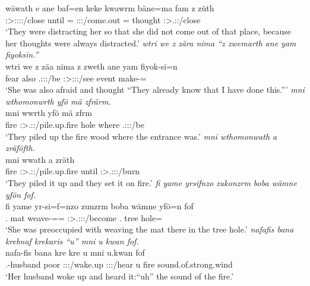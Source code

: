 \begin{exe}
	\gll wäwath e ane baf=en keke kwawrm bäne=ma fam z züth\\
	\Stpl:\Sbj>\Tsg:\Obj:\Io:\Nonpast:\Ipfv/close until {\Dem} \Recog={\Loc} {\Neg} \Sg:\Sbj:\Pst:\Dur/come.out \Recog={\Loc} thought {\Iam} \Stpl:\Sbj>\Tsg.\F:\Io:\Iter/close\\
	\trans `They were distracting her so that she did not come out of that place, because her thoughts were always distracted.'
	\emph{wtri we z zära nima ``z zwemarth ane yam fiyoksin.''}\\
	\gll wtri we z zäa nima z zweth ane yam fiyok-si=n\\
	fear also {\Iam} \Tsg.\F:\Sbj:\Pst:\Ipfv/be {\Quot} {\Iam} \Stpl:\Sbj>\Fsg:\Obj:\Rpst:\Pfv/see {\Dem} event make-\Nmlz=\Loc\\
	\trans `She was also afraid and thought ``They already know that I have done this.'''
	\emph{mni wthomonwrth yfö mä zfrärm.}\\
	\gll mni wwrth yfö mä zfrm\\
	fire \Stpl:\Sbj>\Tsg.\F:\Nonpast:\Ipfv/pile.up.fire hole where \Tsg.\F:\Sbj:\Pst:\Dur/be\\
	\trans `They piled up the fire wood where the entrance was.'
	\emph{mni wthomonwath a zräföfth.}\\
	\gll mni wwath a zräth\\
	fire \Stpl:\Sbj>\Tsg.\F:\Pst:\Ipfv/pile.up.fire until \Stpl:\Sbj>\Tsg.\F:\Obj:\Irr:\Pfv/burn\\
	\trans `They piled it up and they set it on fire.'
	\emph{fi yame yrsifnzo zukonzrm boba wämne yfön fof.}\\
	\gll fi yame yr-si=f=nzo zunzrm boba wämne yfö=n fof\\
	\Third.{\Abs} mat weave-\Nmlz=\Erg={\Only} \Sg:\Sbj>\Tsg.\F:\Obj:\Pst:\Dur/become \Med.{\Abl} tree hole={\Loc} {\Emph}\\
	\trans `She was preoccupied with weaving the mat there in the tree hole.'
	\emph{nafafis bana krebnaf krekaris ``u'' mni u kwan fof.}\\
	\gll nafa-fis bana kre kre u mni {u.kwan} fof\\
	\Third.\Poss-husband poor \Stsg:\Sbj:\Irr:\Pfv/wake.up \Stsg:\Sbj:\Irr:\Pfv/hear u fire {sound.of.strong.wind} \Emph\\
	\trans `Her husband woke up and heard it:``uh'' the sound of the fire.'

\end{exe}
